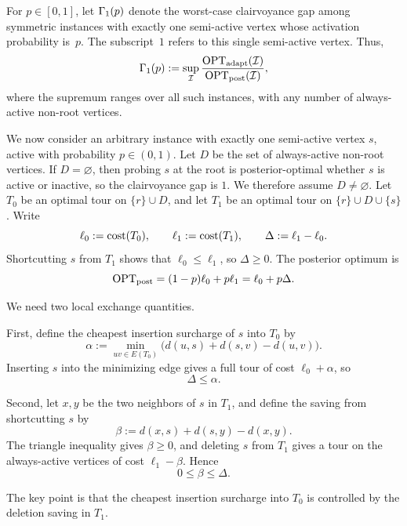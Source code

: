 \documentclass[12pt,a4paper,oneside]{report}
\begin{document}
For $p\in[0,1]$, let $\Gamma_{1}(p)$ denote the worst-case clairvoyance gap
among symmetric instances with exactly one semi-active vertex whose activation
probability is~$p$.  The subscript~$1$ refers to this single semi-active
vertex.  Thus,
\[
  \Gamma_{1}(p)
  :=\sup_{\mathcal I}
  \frac{\operatorname{OPT}_\mathrm{adapt}(\mathcal I)}{\operatorname{OPT}_\mathrm{post}(\mathcal I)},
\]
where the supremum ranges over all such instances, with any number of
always-active non-root vertices.

We now consider an arbitrary instance with exactly one semi-active vertex $s$,
active with probability $p\in(0,1)$.  Let $D$ be the
set of always-active non-root vertices.  If $D=\varnothing$, then probing
$s$ at the root is posterior-optimal whether $s$ is active or inactive, so the
clairvoyance gap is $1$.  We therefore assume $D\ne\varnothing$.  Let $T_0$ be
an optimal tour on
$\{r\}\cup D$, and let $T_1$ be an optimal tour on
$\{r\}\cup D\cup\{s\}$.  Write
\[
  \ell_0:=\operatorname{cost}(T_0),
  \qquad
  \ell_1:=\operatorname{cost}(T_1),
  \qquad
  \Delta:=\ell_1-\ell_0.
\]
Shortcutting $s$ from $T_1$ shows that $\ell_0\le\ell_1$, so $\Delta\ge0$.  The
posterior optimum is
\begin{equation}\label{eq:post-general}
  \operatorname{OPT}_\mathrm{post}=(1-p)\ell_0+p\ell_1=\ell_0+p\Delta.
\end{equation}

We need two local exchange quantities.

First, define the cheapest insertion surcharge of $s$ into $T_0$ by
\begin{equation}\label{eq:alpha}
  \alpha
  :=\min_{uv\in E(T_0)}
  \bigl(d(u,s)+d(s,v)-d(u,v)\bigr).
\end{equation}
Inserting $s$ into the minimizing edge gives a full tour of cost $\ell_0+\alpha$,
so
\begin{equation}\label{eq:delta-alpha}
  \Delta\le\alpha.
\end{equation}

Second, let $x,y$ be the two neighbors of $s$ in $T_1$, and define the saving
from shortcutting $s$ by
\begin{equation}\label{eq:beta}
  \beta:=d(x,s)+d(s,y)-d(x,y).
\end{equation}
The triangle inequality gives $\beta\ge0$, and deleting $s$ from $T_1$ gives
a tour on the always-active vertices of cost $\ell_1-\beta$.  Hence
\begin{equation}\label{eq:beta-delta}
  0\le\beta\le\Delta.
\end{equation}

The key point is that the cheapest insertion surcharge into $T_0$ is
controlled by the deletion saving in $T_1$.
\end{document}
